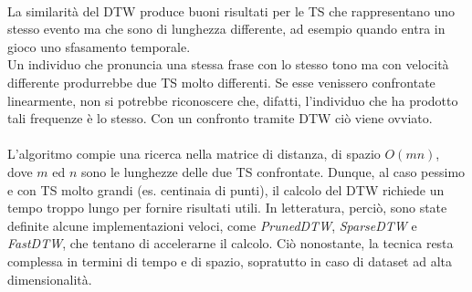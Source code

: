 \\
La similarità del DTW produce buoni risultati per le TS che rappresentano uno stesso evento ma che sono di lunghezza differente, ad esempio quando entra in gioco uno sfasamento temporale.\\
Un individuo che pronuncia una stessa frase con lo stesso tono ma con velocità differente produrrebbe due TS molto differenti. Se esse venissero confrontate linearmente, non si potrebbe riconoscere che, difatti, l'individuo che ha prodotto tali frequenze è lo stesso. Con un confronto tramite DTW ciò viene ovviato.\\
\\
L'algoritmo compie una ricerca nella matrice di distanza, di spazio $O(mn)$, dove $m$ ed $n$ sono le lunghezze delle due TS confrontate.
Dunque, al caso pessimo e con TS molto grandi (es. centinaia di punti), il calcolo del DTW richiede un tempo troppo lungo per fornire risultati utili. In letteratura, perciò, sono state definite alcune implementazioni veloci, come \textit{PrunedDTW}, \textit{SparseDTW} e \textit{FastDTW}, che tentano di accelerarne il calcolo. Ciò nonostante, la tecnica resta complessa in termini di tempo e di spazio, sopratutto in caso di dataset ad alta dimensionalità.\\

